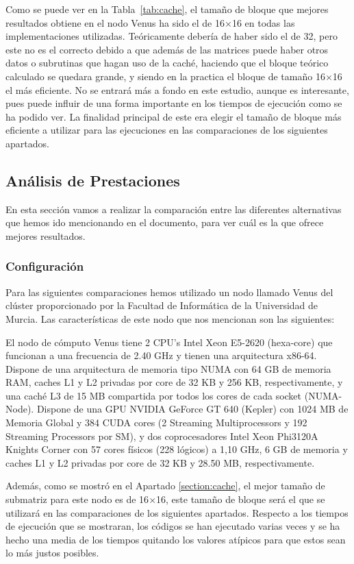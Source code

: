 \documentclass[a4paper,12pt]{article}
\begin{document}
Como se puede ver en la Tabla~\ref{tab:cache}, el tamaño de bloque que mejores resultados obtiene en el nodo Venus ha sido el de 16$\times$16 en todas las implementaciones utilizadas. Teóricamente debería de haber sido el de 32, pero este no es el correcto debido a que además de las matrices puede haber otros datos o subrutinas que hagan uso de la caché, haciendo que el bloque teórico calculado se quedara grande, y siendo en la practica el bloque de tamaño 16$\times$16 el más eficiente. No se entrará más a fondo en este estudio, aunque es interesante, pues puede influir de una forma importante en los tiempos de ejecución como se ha podido ver. La finalidad principal de este era elegir el tamaño de bloque más eficiente a utilizar para las ejecuciones en las comparaciones de los siguientes apartados.


\subsection{Análisis de Prestaciones}
En esta sección vamos a realizar la comparación entre las diferentes alternativas que hemos ido mencionando en el documento, para ver cuál es la que ofrece mejores resultados.


\subsubsection{Configuración}
Para las siguientes comparaciones hemos utilizado un nodo llamado Venus del clúster proporcionado por la Facultad de Informática de la Universidad de Murcia. Las características de este nodo que nos mencionan son las siguientes:

El nodo de cómputo Venus tiene 2 CPU's Intel Xeon E5-2620 (hexa-core) que funcionan a una frecuencia de 2.40 GHz y tienen una arquitectura x86-64. Dispone de una arquitectura de memoria tipo NUMA con 64 GB de memoria RAM, caches L1 y L2 privadas por core de 32 KB y 256 KB, respectivamente, y una caché L3 de 15 MB compartida por todos los cores de cada socket (NUMA-Node). Dispone de una GPU NVIDIA GeForce GT 640 (Kepler) con 1024 MB de Memoria Global y 384 CUDA cores (2 Streaming Multiprocessors y 192 Streaming Processors por SM), y dos coprocesadores Intel Xeon Phi3120A Knights Corner con 57 cores físicos (228 lógicos) a 1,10 GHz, 6 GB de memoria y caches L1 y L2 privadas por core de 32 KB y 28.50 MB, respectivamente.

Además, como se mostró en el Apartado \ref{section:cache},  el mejor tamaño de submatriz para este nodo es de 16$\times$16, este tamaño de bloque será el que se utilizará en las comparaciones de los siguientes apartados. Respecto a los tiempos de ejecución que se mostraran, los códigos se han ejecutado varias veces y se ha hecho una media de los tiempos quitando los valores atípicos para que estos sean lo más justos posibles.
\end{document}
